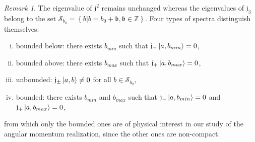 \documentclass[12pt,a4paper]{report}
\theoremstyle{definition}
\theoremstyle{remark}
\newtheorem*{remark}{Remark}
\theoremstyle{remark}
\begin{document}
\begin{remark}
The eigenvalue of $\mathfrak{j}^2$ remains unchanged whereas the eigenvalues of $\mathfrak{j}_3$ belong to the set $\mathcal{S}_{b_0}=\left\lbrace b|b=b_0+\mathfrak{b},\mathfrak{b}\in\mathbb{Z} \right\rbrace$. Four types of spectra distinguish themselves:
\begin{enumerate}[i.]
\item bounded below: there exists $b_{min}$ such that $\mathfrak{j}_-\ket{a,b_{min}}=0$,
\item bounded above: there exists $b_{max}$ such that $\mathfrak{j}_+\ket{a,b_{max}}=0$,
\item unbounded: $\mathfrak{j}_\pm\ket{a,b}\neq 0$ for all $b\in\mathcal{S}_{b_0}$,
\item bounded: there exists $b_{min}$ and $b_{max}$ such that $\mathfrak{j}_-\ket{a,b_{min}}=0$ and $\mathfrak{j}_+\ket{a,b_{max}}=0$,
\end{enumerate}
from which only the bounded ones are of physical interest in our study of the angular momentum realization, since the other ones are non-compact.
\end{remark}
\end{document}
